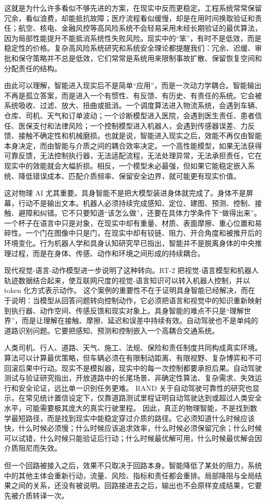 这就是为什么许多看似不够先进的方案，在现实中反而更稳定。工程系统常常保留冗余，看似浪费，却能抵抗故障；医疗流程看似缓慢，却是在用时间换取验证和责任；航空、核电、金融风控等高风险系统不会轻易采用未经长期验证的最优算法，因为局部性能提升不能抵消系统性失败风险。现实中的“笨”，有时不是低效，而是稳定性的价格。复杂高风险系统研究和系统安全理论都提醒我们：冗余、迟缓、审批和保守策略并不总是低效，它们常常是系统用来限制事故扩散、保留恢复空间和分配责任的结构。\cite{perrow1984,leveson2011}

由此可以理解，智能进入现实后不是简单“应用”，而是一次动力学耦合。智能输出不再是孤立答案，而是进入一个有惯性、有反馈、有历史、有责任的系统。它会被系统吸收、过滤、放大、扭曲或抵消。一个调度算法进入物流系统，会遇到车辆、仓库、司机、天气和订单波动；一个诊断模型进入医院，会遇到医生责任、患者信任、医保支付和法律风险；一个控制模型进入机器人，会遇到传感器误差、力反馈、接触不确定性和机械磨损。也就是说，智能进入现实之后，效能不再仅由智能本身决定，而由智能与介质之间的耦合效率决定。一个高性能模型，如果无法获得可靠反馈，无法控制执行器，无法适配流程，无法处理异常，无法承担责任，它在现实中的效能就会大幅折损。相反，一个模型未必最强，但如果它能稳定嵌入系统、降低错误成本、匹配介质频率、保留安全边界，就可能更有现实价值。


这对物理 AI 尤其重要。具身智能不是把大模型装进身体就完成了。身体不是屏幕，行动不是输出文本。机器人必须持续完成感知、定位、建图、预测、控制、接触、避障和纠错。它不只要知道“该怎么做”，还要在具体力学条件下“做得出来”。一个杯子在语言中只是对象，在现实中却有重量、材质、表面摩擦、重心位置和易碎性。一个门在图像中只是门，在现实中却有铰链、阻力、开合角度和被推开后的环境变化。行为机器人学和具身认知研究早已指出，智能并不是脱离身体的中央推理过程，而是在身体、传感、动作和环境之间形成的持续耦合。\cite{brooks1991,pfeifer2006}

现代视觉-语言-动作模型进一步说明了这种转向。RT-2 把视觉-语言模型和机器人轨迹数据结合起来，使互联网尺度的视觉-语言知识可以转入机器人控制，并以 token 化方式表示动作。\cite{zitkovich2023} 这个案例的重要性不在于证明具身智能已经解决，而在于说明：当模型从回答问题转向控制动作，它必须把语言和视觉中的知识重新映射到执行器、动作空间、传感反馈和现实对象上。具身智能的难点不只是“理解世界”，而是让理解在接触、摩擦、延迟和误差中持续有效。自动驾驶也不是单纯的道路识别问题。它要把感知、预测和控制嵌入一个高耦合交通系统。

人类司机、行人、道路、天气、施工、法规、保险和责任制度共同构成真实环境。算法可以计算最优策略，但车辆必须在有限制动距离、有限视野、复杂博弈和不可回滚后果中行动。现实不是模拟器，现实中的每一次控制都要承担后果。自动驾驶测试与验证研究指出，开放道路中的长尾场景、非确定性算法、复杂需求、失效运行和安全论证，远比单一识别任务更难。\cite{koopman2016} RAND 关于自动驾驶可靠性的研究也显示，在常见统计置信设定下，仅靠道路测试里程证明自动驾驶达到或超过人类安全水平，可能需要极其庞大的真实行驶里程。\cite{kalra2016} 因此，真正的物理智能，不是找到数学最短路径，而是找到现实中能稳定穿过介质的路径。它必须知道什么时候应该快，什么时候必须慢；什么时候应该追求效率，什么时候必须保留冗余；什么时候可以试错，什么时候只能验证后行动；什么时候最优解可用，什么时候最优解会因介质阻尼而失效。

但一个回路被接入之后，效果不只取决于回路本身。智能降低了某处的阻力，系统中的其他主体会重新行动，流量、风险、指标和责任都会重排。局部降阻与全局结果之间的关系，还没有被说明。回路接进去之后，输出也不会原样变成结果，它要先被介质转译一次。
